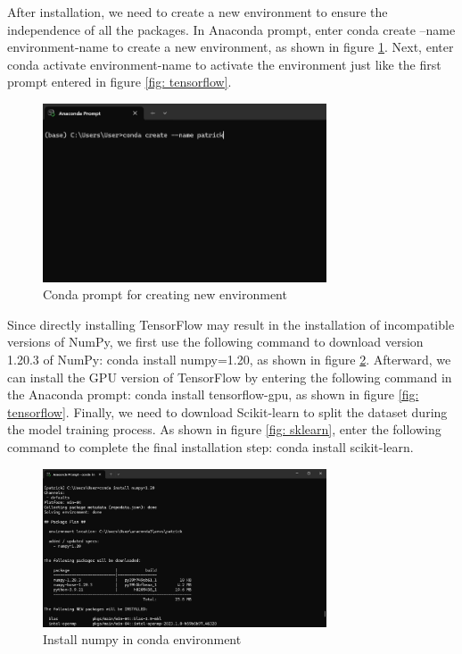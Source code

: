 \begin{ZhChapter}
After installation, we need to create a new environment to ensure the independence of all the packages. In Anaconda prompt, enter conda create --name environment-name to create a new environment, as shown in figure \ref{fig: createEnv}. Next, enter conda activate environment-name to activate the environment just like the first prompt entered in figure \ref{fig: tensorflow}.

\begin{figure}[htbp]
    \centering
    \includegraphics[width = 0.75\textwidth]{image/createEnv.png}
    \caption{Conda prompt for creating new environment}
    \label{fig: createEnv}
\end{figure}

Since directly installing TensorFlow may result in the installation of incompatible versions of NumPy, we first use the following command to download version 1.20.3 of NumPy: conda install numpy=1.20, as shown in figure \ref{fig: numpy}. Afterward, we can install the GPU version of TensorFlow by entering the following command in the Anaconda prompt: conda install tensorflow-gpu, as shown in figure \ref{fig: tensorflow}. Finally, we need to download Scikit-learn to split the dataset during the model training process. As shown in figure \ref{fig: sklearn}, enter the following command to complete the final installation step: conda install scikit-learn.

\begin{figure}[htbp]
    \centering
    \includegraphics[width = 0.75\textwidth]{image/numpy.png}
    \caption{Install numpy in conda environment}
    \label{fig: numpy}
\end{figure}


\end{ZhChapter}
